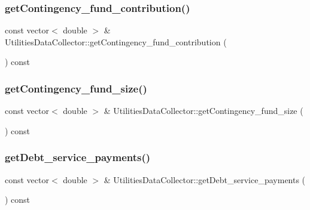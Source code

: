 \subsubsection{\texorpdfstring{get\+Contingency\+\_\+fund\+\_\+contribution()}{getContingency\_fund\_contribution()}}
{\footnotesize\ttfamily const vector$<$ double $>$ \& Utilities\+Data\+Collector\+::get\+Contingency\+\_\+fund\+\_\+contribution (\begin{DoxyParamCaption}{ }\end{DoxyParamCaption}) const}

\mbox{\label{classUtilitiesDataCollector_a0533e321af5487a24c1721ae62b8f0c6_a0533e321af5487a24c1721ae62b8f0c6}} 
\subsubsection{\texorpdfstring{get\+Contingency\+\_\+fund\+\_\+size()}{getContingency\_fund\_size()}}
{\footnotesize\ttfamily const vector$<$ double $>$ \& Utilities\+Data\+Collector\+::get\+Contingency\+\_\+fund\+\_\+size (\begin{DoxyParamCaption}{ }\end{DoxyParamCaption}) const}

\mbox{\label{classUtilitiesDataCollector_a7e5dce8713ac981d00880349136a4eed_a7e5dce8713ac981d00880349136a4eed}} 
\subsubsection{\texorpdfstring{get\+Debt\+\_\+service\+\_\+payments()}{getDebt\_service\_payments()}}
{\footnotesize\ttfamily const vector$<$ double $>$ \& Utilities\+Data\+Collector\+::get\+Debt\+\_\+service\+\_\+payments (\begin{DoxyParamCaption}{ }\end{DoxyParamCaption}) const}

